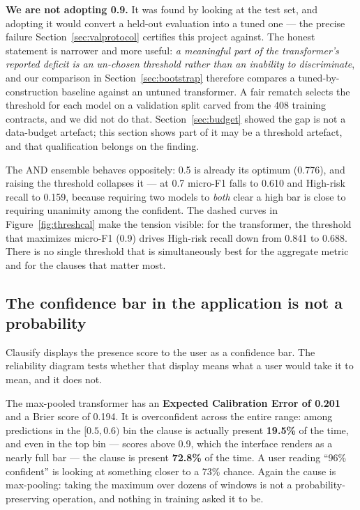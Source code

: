\textbf{We are not adopting 0.9.} It was found by looking at the test set, and adopting it would convert a held-out evaluation into a tuned one --- the precise failure Section~\ref{sec:valprotocol} certifies this project against. The honest statement is narrower and more useful: \emph{a meaningful part of the transformer's reported deficit is an un-chosen threshold rather than an inability to discriminate}, and our comparison in Section~\ref{sec:bootstrap} therefore compares a tuned-by-construction baseline against an untuned transformer. A fair rematch selects the threshold for each model on a validation split carved from the 408 training contracts, and we did not do that. Section~\ref{sec:budget} showed the gap is not a data-budget artefact; this section shows part of it may be a threshold artefact, and that qualification belongs on the finding.

The AND ensemble behaves oppositely: 0.5 is already its optimum (0.776), and raising the threshold collapses it --- at 0.7 micro-F1 falls to 0.610 and High-risk recall to 0.159, because requiring two models to \emph{both} clear a high bar is close to requiring unanimity among the confident. The dashed curves in Figure~\ref{fig:threshcal} make the tension visible: for the transformer, the threshold that maximizes micro-F1 (0.9) drives High-risk recall down from 0.841 to 0.688. There is no single threshold that is simultaneously best for the aggregate metric and for the clauses that matter most.

\subsection{The confidence bar in the application is not a probability}
Clausify displays the presence score to the user as a confidence bar. The reliability diagram tests whether that display means what a user would take it to mean, and it does not.

The max-pooled transformer has an \textbf{Expected Calibration Error of 0.201} and a Brier score of 0.194. It is overconfident across the entire range: among predictions in the $[0.5, 0.6)$ bin the clause is actually present \textbf{19.5\%} of the time, and even in the top bin --- scores above 0.9, which the interface renders as a nearly full bar --- the clause is present \textbf{72.8\%} of the time. A user reading ``96\% confident'' is looking at something closer to a 73\% chance. Again the cause is max-pooling: taking the maximum over dozens of windows is not a probability-preserving operation, and nothing in training asked it to be.

